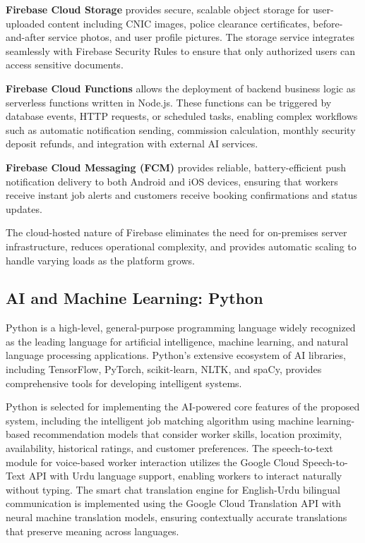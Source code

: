 \documentclass[12pt,a4paper]{report}
\begin{document}
\textbf{Firebase Cloud Storage} provides secure, scalable object storage for user-uploaded content including CNIC images, police clearance certificates, before-and-after service photos, and user profile pictures. The storage service integrates seamlessly with Firebase Security Rules to ensure that only authorized users can access sensitive documents.

\textbf{Firebase Cloud Functions} allows the deployment of backend business logic as serverless functions written in Node.js. These functions can be triggered by database events, HTTP requests, or scheduled tasks, enabling complex workflows such as automatic notification sending, commission calculation, monthly security deposit refunds, and integration with external AI services.

\textbf{Firebase Cloud Messaging (FCM)} provides reliable, battery-efficient push notification delivery to both Android and iOS devices, ensuring that workers receive instant job alerts and customers receive booking confirmations and status updates.

The cloud-hosted nature of Firebase eliminates the need for on-premises server infrastructure, reduces operational complexity, and provides automatic scaling to handle varying loads as the platform grows.

\subsection{AI and Machine Learning: Python}
Python is a high-level, general-purpose programming language widely recognized as the leading language for artificial intelligence, machine learning, and natural language processing applications. Python's extensive ecosystem of AI libraries, including TensorFlow, PyTorch, scikit-learn, NLTK, and spaCy, provides comprehensive tools for developing intelligent systems.

Python is selected for implementing the AI-powered core features of the proposed system, including the intelligent job matching algorithm using machine learning-based recommendation models that consider worker skills, location proximity, availability, historical ratings, and customer preferences. The speech-to-text module for voice-based worker interaction utilizes the Google Cloud Speech-to-Text API with Urdu language support, enabling workers to interact naturally without typing. The smart chat translation engine for English-Urdu bilingual communication is implemented using the Google Cloud Translation API with neural machine translation models, ensuring contextually accurate translations that preserve meaning across languages.
\end{document}
